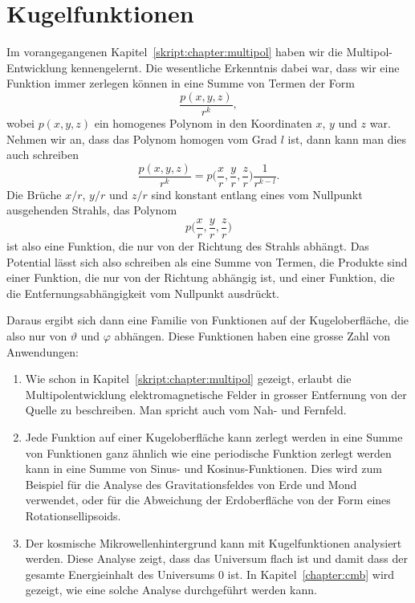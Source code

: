 %
%
%
\chapter{Kugelfunktionen%
\label{skript:chapter:kugelfunktionen}}
\rhead{}
Im vorangegangenen Kapitel~\ref{skript:chapter:multipol} haben wir
die Multipol-Entwicklung kennengelernt. 
Die wesentliche Erkenntnis dabei war, dass wir eine Funktion immer zerlegen
können in eine Summe von Termen der Form
\[
\frac{p(x,y,z)}{r^k},
\]
wobei $p(x,y,z)$ ein homogenes Polynom in den Koordinaten $x$, $y$ und
$z$ war.
Nehmen wir an, dass das Polynom homogen vom Grad $l$ ist, dann kann man dies
auch schreiben
\[
\frac{p(x,y,z)}{r^k}
=
p\biggl(\frac{x}{r},\frac{y}{r},\frac{z}{r}\biggr)\frac1{r^{k-l}}.
\]
Die Brüche $x/r$, $y/r$ und $z/r$ sind konstant entlang eines vom
Nullpunkt ausgehenden Strahls, das Polynom 
\[
p\biggl(\frac{x}{r},\frac{y}{r},\frac{z}{r}\biggr)
\]
ist also eine Funktion, die nur von der Richtung des Strahls
abhängt.
Das Potential lässt sich also schreiben als eine Summe von Termen,
die Produkte sind einer Funktion, die nur von der Richtung abhängig
ist, und einer Funktion, die die Entfernungsabhängigkeit vom Nullpunkt
ausdrückt.

Daraus ergibt sich dann eine Familie von Funktionen auf der Kugeloberfläche,
die also nur von $\vartheta$ und $\varphi$ abhängen.
Diese Funktionen haben eine grosse Zahl von Anwendungen:

\begin{enumerate}
\item
Wie schon in Kapitel~\ref{skript:chapter:multipol} gezeigt, erlaubt 
die Multipolentwicklung elektromagnetische Felder in grosser
Entfernung von der Quelle zu beschreiben.
Man spricht auch vom Nah- und Fernfeld.
\item
Jede Funktion auf einer Kugeloberfläche kann zerlegt werden in eine
Summe von Funktionen ganz ähnlich wie eine periodische Funktion
zerlegt werden kann in eine Summe von Sinus- und Kosinus-Funktionen.
Dies wird zum Beispiel für die Analyse des Gravitationsfeldes von
Erde und Mond verwendet, oder für die Abweichung der Erdoberfläche
von der Form eines Rotationsellipsoids.
\item
Der kosmische Mikrowellenhintergrund kann mit Kugelfunktionen analysiert
werden.
Diese Analyse zeigt, dass das Universum flach ist und damit dass der
gesamte Energieinhalt des Universums $0$ ist.
In Kapitel~\ref{chapter:cmb} wird gezeigt, wie eine solche Analyse
durchgeführt werden kann.
\end{enumerate}

